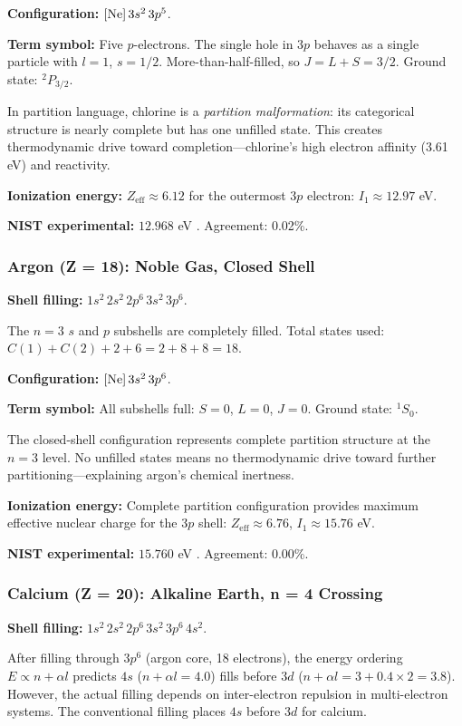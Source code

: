 \documentclass[11pt,a4paper]{article}
\theoremstyle{definition}
\theoremstyle{remark}
\begin{document}
\textbf{Configuration:} $[{\rm Ne}]\,3s^2\,3p^5$.

\textbf{Term symbol:} Five $p$-electrons. The single hole in $3p$ behaves as a single particle with $l = 1$, $s = 1/2$. More-than-half-filled, so $J = L + S = 3/2$. Ground state: ${}^2P_{3/2}$.

In partition language, chlorine is a \emph{partition malformation}: its categorical structure is nearly complete but has one unfilled state. This creates thermodynamic drive toward completion---chlorine's high electron affinity (3.61 eV) and reactivity.

\textbf{Ionization energy:} $Z_{\mathrm{eff}} \approx 6.12$ for the outermost $3p$ electron: $I_1 \approx 12.97$ eV.

\textbf{NIST experimental:} $12.968$ eV \citep{nist_asd}. Agreement: 0.02\%.

\subsubsection{Argon (Z = 18): Noble Gas, Closed Shell}

\textbf{Shell filling:} $1s^2\,2s^2\,2p^6\,3s^2\,3p^6$.

The $n = 3$ $s$ and $p$ subshells are completely filled. Total states used: $C(1) + C(2) + 2 + 6 = 2 + 8 + 8 = 18$.

\textbf{Configuration:} $[{\rm Ne}]\,3s^2\,3p^6$.

\textbf{Term symbol:} All subshells full: $S = 0$, $L = 0$, $J = 0$. Ground state: ${}^1S_0$.

The closed-shell configuration represents complete partition structure at the $n = 3$ level. No unfilled states means no thermodynamic drive toward further partitioning---explaining argon's chemical inertness.

\textbf{Ionization energy:} Complete partition configuration provides maximum effective nuclear charge for the $3p$ shell: $Z_{\mathrm{eff}} \approx 6.76$, $I_1 \approx 15.76$ eV.

\textbf{NIST experimental:} $15.760$ eV \citep{nist_asd}. Agreement: 0.00\%.

\subsubsection{Calcium (Z = 20): Alkaline Earth, n = 4 Crossing}

\textbf{Shell filling:} $1s^2\,2s^2\,2p^6\,3s^2\,3p^6\,4s^2$.

After filling through $3p^6$ (argon core, 18 electrons), the energy ordering $E \propto n + \alpha l$ predicts $4s$ ($n + \alpha l = 4.0$) fills before $3d$ ($n + \alpha l = 3 + 0.4 \times 2 = 3.8$). However, the actual filling depends on inter-electron repulsion in multi-electron systems. The conventional filling places $4s$ before $3d$ for calcium.
\end{document}
